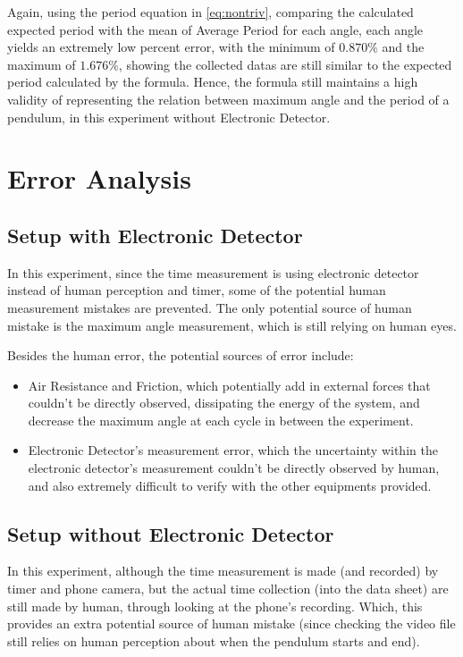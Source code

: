 \documentclass{article}
\begin{document}
Again, using the period equation in \ref{eq:nontriv}, comparing the calculated expected period with the mean of Average Period for each angle, each angle yields an extremely low percent error, with the minimum of $0.870\%$ and the maximum of $1.676\%$, showing the collected datas are still similar to the expected period calculated by the formula. Hence, the formula still maintains a high validity of representing the relation between maximum angle and the period of a pendulum, in this experiment without Electronic Detector.

\newpage

\section{Error Analysis}
\subsection{Setup with Electronic Detector}
In this experiment, since the time measurement is using electronic detector instead of human perception and timer, some of the potential human measurement mistakes are prevented. The only potential source of human mistake is the maximum angle measurement, which is still relying on human eyes.

Besides the human error, the potential sources of error include:
\begin{itemize}
    \item Air Resistance and Friction, which potentially add in external forces that couldn't be directly observed, dissipating the energy of the system, and decrease the maximum angle at each cycle in between the experiment. 
    \item Electronic Detector's measurement error, which the uncertainty within the electronic detector's measurement couldn't be directly observed by human, and also extremely difficult to verify with the other equipments provided.
\end{itemize}

\hfil

\subsection{Setup without Electronic Detector}
In this experiment, although the time measurement is made (and recorded) by timer and phone camera, but the actual time collection (into the data sheet) are still made by human, through looking at the phone's recording. Which, this provides an extra potential source of human mistake (since checking the video file still relies on human perception about when the pendulum starts and end).
\end{document}
